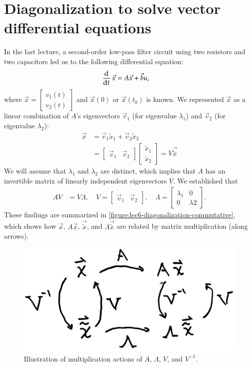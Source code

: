\chapter{Diagonalization to solve vector differential equations}
In the last lecture, a second-order low-pass filter circuit using two resistors and two capacitors led us to the following differential equation:
\begin{align}
  \dod{}{t} \vec{x}
  &= A \vec{x} + \vec{b} u,
\end{align}
where \(\vec{x} = \begin{bmatrix}
  v_1(t) \\ v_2(t)
\end{bmatrix}\)
and \(\vec{x}(0)\) or \(\vec{x}(t_0)\) is known.
We represented \(\vec{x}\) as a linear combination of \(A\)'s eigenvectors \(\vec{v}_1\) (for eigenvalue \(\lambda_1\)) and \(\vec{v}_2\) (for eigenvalue \(\lambda_2\)):
\begin{align}
  \vec{x}
  &= \vec v_1 \tilde x_1
  + \vec v_2 \tilde x_2\\
  &=
  \begin{bmatrix}
    \vec v_1 & \vec v_2
  \end{bmatrix}
  \begin{bmatrix}
    \tilde x_1\\
    \tilde x_2
  \end{bmatrix}
    = V \vec {\tilde x}
\end{align}
We will assume that \(\lambda_1\) and \(\lambda_2\) are distinct, which implies that \(A\) has an invertible matrix of linearly independent eigenvectors \(V\).%
 We established that
\begin{align}
  A V &= V \Lambda, \quad
  V = \begin{bmatrix}
    \vec v_1 & \vec v_2
\end{bmatrix}, \quad
  \Lambda = \begin{bmatrix}
    \lambda_1 & 0 \\
    0 & \lambda 2
\end{bmatrix}.
\end{align}
These findings are summarized in \autoref{figure:lec6-diagonalization-commutative}, which shows how \(\vec x\), \(A \vec{x}\), \(\vec {\tilde x}\), and \(\Lambda \vec{\tilde x}\) are related by matrix multiplication (along arrows).

\begin{figure}
  \centering
  \includegraphics[width=0.75\linewidth]{figures/6/diagonalization-commutative}
  \caption{Illustration of multiplication actions of \(A\), \(\Lambda\), \(V\), and \(V^{-1}\).}
  \label{figure:lec6-diagonalization-commutative}
\end{figure}


